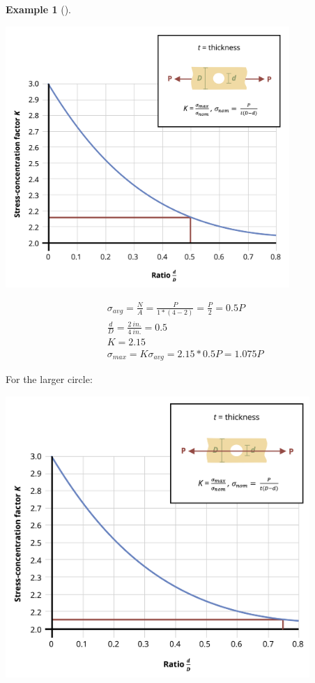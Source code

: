 \documentclass[
  letterpaper,
  DIV=11,
  numbers=noendperiod]{scrreprt}
\theoremstyle{definition}
\newtheorem{example}{Example}[chapter]
\theoremstyle{remark}
\begin{document}
\begin{tcolorbox}
\begin{example}[]
\begin{tcolorbox}
\begin{center}
\includegraphics[width=4.23958in,height=\textheight]{images/PNGs/Example 5.2 part 2.png}
\end{center}

\[
\begin{aligned}
& \sigma_{avg}=\frac{N}{A}=\frac{P}{1 *(4-2)}=\frac{P}{2}=0.5 P \\
& \frac{d}{D}=\frac{2{~in.}}{4{~in.}}=0.5 \\
& K=2.15 \\
& \sigma_{max }=K \sigma_{avg}=2.15 * 0.5 P=1.075 P
\end{aligned}
\]

For the larger circle:

\begin{center}
\includegraphics[width=4.54167in,height=\textheight]{images/PNGs/Example 5.2 part 3.png}
\end{center}


\end{tcolorbox}
\end{example}
\end{tcolorbox}
\end{document}
